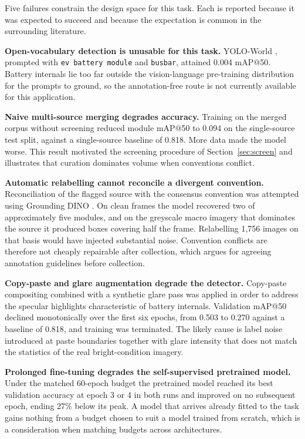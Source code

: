 \noindent Five failures constrain the design space for this task. Each is reported
because it was expected to succeed and because the expectation is common in the
surrounding literature.

\textbf{Open-vocabulary detection is unusable for this task.} YOLO-World
\cite{yoloworld}, prompted with \texttt{ev battery module} and \texttt{busbar},
attained 0.004 mAP@50. Battery internals lie too far outside the vision-language
pre-training distribution for the prompts to ground, so the annotation-free route is
not currently available for this application.

\textbf{Naive multi-source merging degrades accuracy.} Training on the merged corpus
without screening reduced module mAP@50 to 0.094 on the single-source test split,
against a single-source baseline of 0.818. More data made the model worse. This result
motivated the screening procedure of Section~\ref{sec:screen} and illustrates that
curation dominates volume when conventions conflict.

\textbf{Automatic relabelling cannot reconcile a divergent convention.} Reconciliation
of the flagged source with the consensus convention was attempted using Grounding DINO
\cite{groundingdino}. On clean frames the model recovered two of approximately five
modules, and on the greyscale macro imagery that dominates the source it produced
boxes covering half the frame. Relabelling 1,756 images on that basis would have
injected substantial noise. Convention conflicts are therefore not cheaply repairable
after collection, which argues for agreeing annotation guidelines before collection.

\textbf{Copy-paste and glare augmentation degrade the detector.} Copy-paste
compositing \cite{ghiasi2021copypaste} combined with a synthetic glare pass was
applied in order to address the specular highlights characteristic of battery
internals. Validation mAP@50 declined monotonically over the first six epochs, from
0.503 to 0.270 against a baseline of 0.818, and training was terminated. The likely
cause is label noise introduced at paste boundaries together with glare intensity that
does not match the statistics of the real bright-condition imagery.

\textbf{Prolonged fine-tuning degrades the self-supervised pretrained model.} Under
the matched 60-epoch budget the pretrained model reached its best validation accuracy
at epoch 3 or 4 in both runs and improved on no subsequent epoch, ending 27\% below
its peak. A model that arrives already fitted to the task gains nothing from a budget
chosen to suit a model trained from scratch, which is a consideration when matching
budgets across architectures.

